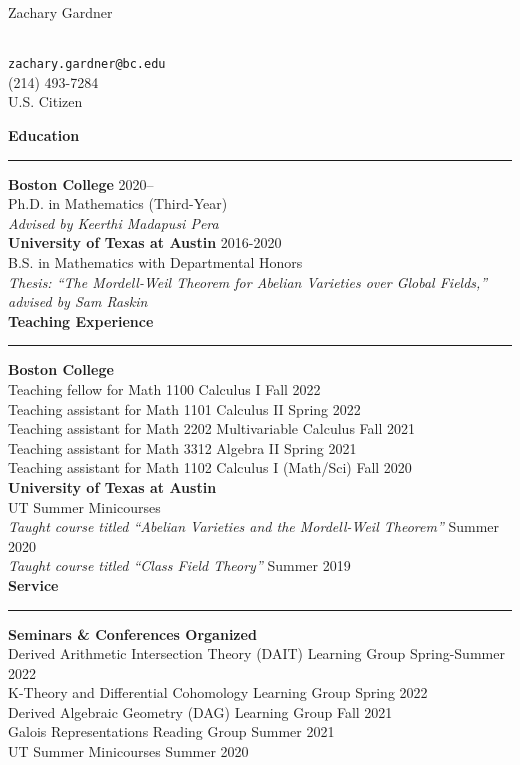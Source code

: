 \documentclass[11pt]{article}
\newenvironment{mysection}{
\color{mygreen}\bfseries\large
}
{
\\ \rule{\textwidth}{1pt}\hspace{-.25em}
} %
\begin{document}
\begin{center}
\begin{LARGE}Zachary Gardner\end{LARGE} \\
\vspace{1em}
\texttt{zachary.gardner@bc.edu} \\
(214) 493-7284 \\
U.S. Citizen \\
\end{center}

\begin{mysection}Education\end{mysection}
\textbf{Boston College} \hfill 2020-- \\
Ph.D. in Mathematics (Third-Year) \\
\textit{Advised by Keerthi Madapusi Pera} \\

\textbf{University of Texas at Austin} \hfill 2016-2020 \\
B.S. in Mathematics with Departmental Honors \\
\textit{Thesis: ``The Mordell-Weil Theorem for Abelian Varieties over Global Fields,'' advised by Sam Raskin} \\

\begin{mysection}Teaching Experience\end{mysection}
\textbf{Boston College} \\
Teaching fellow for Math 1100 Calculus I \hfill Fall 2022 \\
Teaching assistant for Math 1101 Calculus II \hfill Spring 2022 \\
Teaching assistant for Math 2202 Multivariable Calculus \hfill Fall 2021 \\
Teaching assistant for Math 3312 Algebra II \hfill Spring 2021 \\
Teaching assistant for Math 1102 Calculus I (Math/Sci) \hfill Fall 2020 \\

\textbf{University of Texas at Austin} \\
UT Summer Minicourses \\
\textit{Taught course titled ``Abelian Varieties and the Mordell-Weil Theorem''} \hfill Summer 2020 \\
\textit{Taught course titled ``Class Field Theory''} \hfill Summer 2019 \\

\begin{mysection}Service \end{mysection}
\textbf{Seminars \& Conferences Organized} \\
Derived Arithmetic Intersection Theory (DAIT) Learning Group \hfill Spring-Summer 2022 \\
K-Theory and Differential Cohomology Learning Group \hfill Spring 2022 \\
Derived Algebraic Geometry (DAG) Learning Group \hfill Fall 2021 \\
Galois Representations Reading Group \hfill Summer 2021 \\
UT Summer Minicourses \hfill Summer 2020 \\
\end{document}
